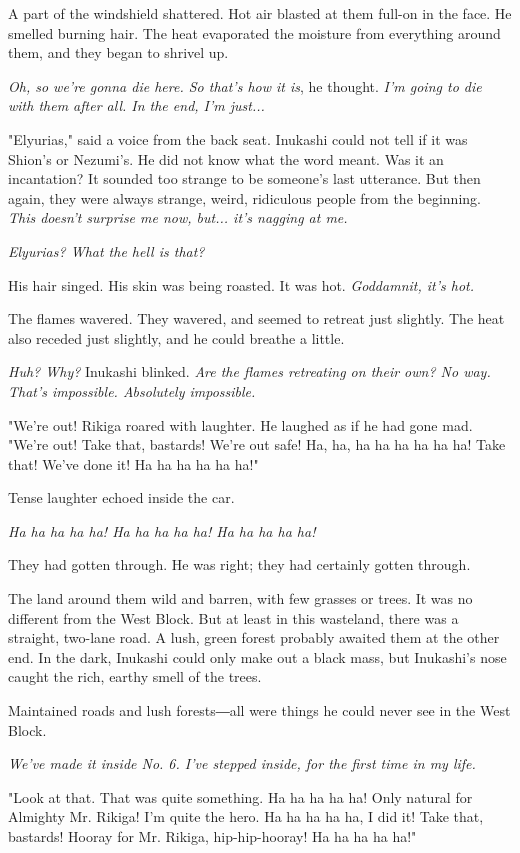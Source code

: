 A part of the windshield shattered. Hot air blasted at them full-on in
the face. He smelled burning hair. The heat evaporated the moisture from
everything around them, and they began to shrivel up.

\emph{Oh, so we're gonna die here. So that's how it is}, he thought. \emph{I'm going
to die with them after all. In the end, I'm just...}

"Elyurias," said a voice from the back seat. Inukashi could not tell if
it was Shion's or Nezumi's. He did not know what the word meant. Was it
an incantation? It sounded too strange to be someone's last utterance.
But then again, they were always strange, weird, ridiculous people from
the beginning. \emph{This doesn't surprise me now, but... it's nagging at me.}

\emph{Elyurias? What the hell is that?}

His hair singed. His skin was being roasted. It was hot. \emph{Goddamnit, it's
hot.}

The flames wavered. They wavered, and seemed to retreat just slightly.
The heat also receded just slightly, and he could breathe a little.

\emph{Huh? Why?} Inukashi blinked. \emph{Are the flames retreating on their own? No
way. That's impossible. Absolutely impossible.}

"We're out! Rikiga roared with laughter. He laughed as if he had gone
mad. "We're out! Take that, bastards! We're out safe! Ha, ha, ha ha ha
ha ha ha! Take that! We've done it! Ha ha ha ha ha ha!"

Tense laughter echoed inside the car.

\emph{Ha ha ha ha ha! Ha ha ha ha ha! Ha ha ha ha ha!}

They had gotten through. He was right; they had certainly gotten
through.

The land around them wild and barren, with few grasses or trees. It was
no different from the West Block. But at least in this wasteland, there
was a straight, two-lane road. A lush, green forest probably awaited
them at the other end. In the dark, Inukashi could only make out a black
mass, but Inukashi's nose caught the rich, earthy smell of the trees.

Maintained roads and lush forests―all were things he could never see in
the West Block.

\emph{We've made it inside No. 6. I've stepped inside, for the first time in
my life.}

"Look at that. That was quite something. Ha ha ha ha ha! Only natural
for Almighty Mr. Rikiga! I'm quite the hero. Ha ha ha ha ha, I did it!
Take that, bastards! Hooray for Mr. Rikiga, hip-hip-hooray! Ha ha ha ha
ha!"

